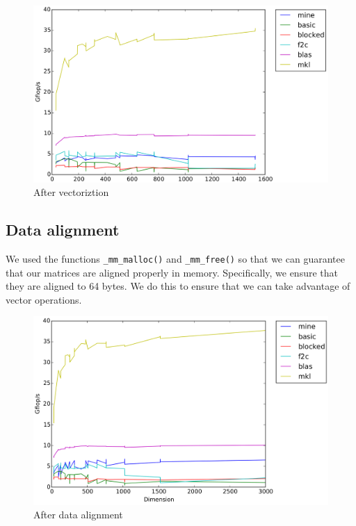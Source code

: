 \documentclass[11pt]{article}
\begin{document}
        \vspace{0.5cm}

        \begin{figure}[H]
        	\centering
        	\includegraphics[width=4.5in]{timing_vector_32_cp.png}
        	\caption{After vectoriztion}
        \end{figure}
        
        \clearpage
        
    
    	    		
   		\subsection{Data alignment}
   		We used the functions \texttt{\_mm\_malloc()} and \texttt{\_mm\_free()} so that we can guarantee that our matrices are aligned properly in memory. Specifically, we ensure that they are aligned to 64 bytes. We do this to ensure that we can take advantage of vector operations.
   		
   		\begin{figure}[H]
   			\centering
   			\includegraphics[width=4.5in]{timing_vector_32_cp_align.png}
   			\caption{After data alignment}
   		\end{figure}
   		
\end{document}
